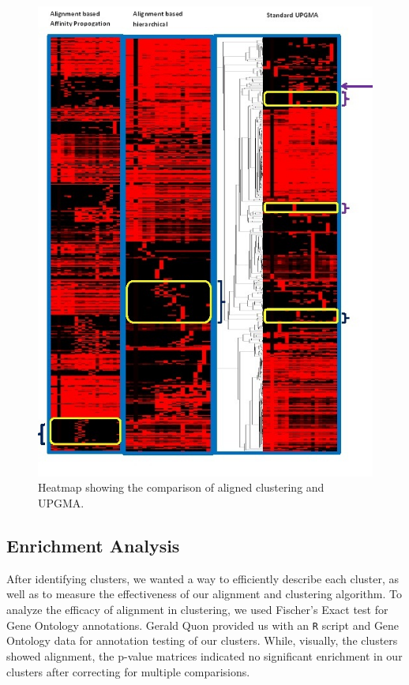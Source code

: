 \documentclass[aps,prd,final,onecolumn,a4paper,10pt]{revtex4}
\begin{document}
\begin{figure}[H]
\centering
\includegraphics[scale=0.75]{ClustercomparisonResults_v2.png}
\caption{Heatmap showing the comparison of aligned clustering and UPGMA.}
\label{fig:ClusterComparison}
\end{figure}


\subsection{Enrichment Analysis}
After identifying clusters, we wanted a way to efficiently describe each cluster, as well as to measure the effectiveness of our alignment and clustering algorithm.
To analyze the efficacy of alignment in clustering, we used Fischer's Exact test for Gene Ontology annotations.
Gerald Quon provided us with an \verb!R! script and Gene Ontology data for annotation testing of our clusters.
While, visually, the clusters showed alignment, the p-value matrices indicated no significant enrichment in our clusters after correcting for multiple comparisions.\\
\end{document}
